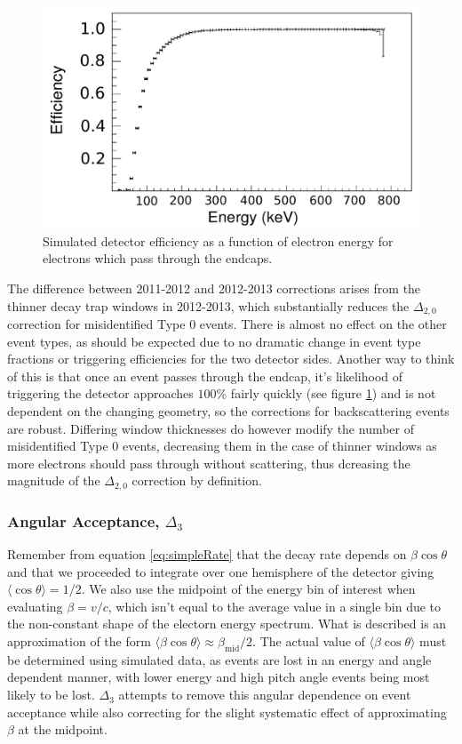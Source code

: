 \begin{figure}[h]
  \centering
  \includegraphics[scale=0.40]{5-UCNAResults/efficiency.pdf}  
  \caption{Simulated detector efficiency as a function of electron energy for electrons which
  pass through the endcaps.}
  \label{fig:effic}
\end{figure}

The difference between 2011-2012 and 2012-2013 corrections arises from the thinner
decay trap windows in 2012-2013, which substantially reduces the $\Delta_{2,0}$
correction for
misidentified Type 0 events. There is almost no effect on the other event types, as should
be expected due to no dramatic change in event type fractions or triggering efficiencies
for the two detector sides. Another way to think of this is that once an event passes through the
endcap, it's likelihood of triggering the detector approaches $100\%$ fairly quickly
(see figure \ref{fig:effic}) and is not dependent on the changing geometry, so the corrections for
backscattering events are robust. Differing window thicknesses do however modify the number of misidentified
Type 0 events, decreasing them in the case of thinner windows as more electrons should pass through without
scattering, thus dcreasing the magnitude of the
$\Delta_{2,0}$ correction by definition.


\subsubsection{Angular Acceptance, $\Delta_{3}$}
Remember from equation \ref{eq:simpleRate} that the decay rate depends on
$\beta\cos\theta$ and that we proceeded to integrate over one hemisphere
of the detector giving $\langle\cos\theta\rangle=1/2$. We also use the midpoint
of the energy bin of interest when evaluating $\beta=v/c$, which isn't equal to the
average value in a single bin due to the non-constant shape of the electorn energy
spectrum. What is described is
an approximation of the form $\langle\beta\cos\theta\rangle \approx \beta_{\mathrm{mid}}/2$. The actual
value of $\langle\beta\cos\theta\rangle$ must be determined using simulated
data, as events are lost in an energy and angle dependent manner, with lower energy and
high pitch angle events being most likely to be lost. $\Delta_{3}$ attempts to
remove this angular dependence on event acceptance while also correcting for the slight
systematic effect of approximating $\beta$ at the midpoint.

